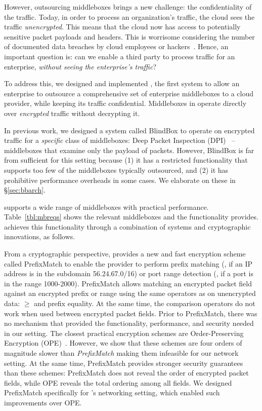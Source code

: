 However, outsourcing middleboxes brings a new challenge: the confidentiality of the traffic. 
Today, in order to process an organization's traffic, the cloud sees the traffic {\em unencrypted}.  This means that the cloud 
now has access to potentially sensitive packet payloads and headers. This is 
worrisome considering the number of documented data breaches by cloud employees or hackers~\cite{PrivacyRecords,databreach}.
Hence, an important question is: can we enable a third party to process traffic for an enterprise, {\em without seeing the enterprise's traffic}?

To address this, we designed and implemented \sys, the first system to allow an enterprise to outsource  a comprehensive set of enterprise middleboxes  to a cloud provider, while keeping its traffic confidential. 
Middleboxes in \sys operate directly over {\it encrypted} traffic without decrypting it. %


In previous work, we designed a system called BlindBox to operate on encrypted traffic for a {\em specific} class of middleboxes: Deep Packet Inspection (DPI)~\cite{blindbox} -- middleboxes that examine only the payload of packets. 
However, BlindBox is far from sufficient for this setting because
 (1) it has a restricted functionality that supports too few of the  middleboxes typically outsourced, and (2) it has prohibitive performance overheads in some cases. We elaborate on these in \S\ref{sec:bbarch}.
 


\sys supports a wide range of middleboxes with practical performance.  Table~\ref{tbl:mbreqs} shows the relevant middleboxes and the functionality \sys provides.
\sys achieves this functionality through a combination of systems and cryptographic innovations, as follows.
   
From a cryptographic perspective, \sys provides a new and fast encryption scheme called PrefixMatch  to enable the provider to perform prefix matching (\eg{}, if an IP address is in the subdomain 56.24.67.0/16) or port range detection (\eg{}, if a port is in the range 1000-2000). PrefixMatch allows matching an encrypted packet field against an encrypted prefix or range using the same operators as on unencrypted data: $\ge$ and prefix equality. At the same time, the comparison operators do not work when used between encrypted packet fields. Prior to PrefixMatch, there was no mechanism that provided the functionality, performance, and  security needed in our setting. The closest practical encryption schemes are Order-Preserving Encryption (OPE)~\cite{boldyreva:ope,popa:mope}. 
However, we show that  these schemes are four orders of magnitude slower than {\it PrefixMatch} making them infeasible for our network setting. At the same time, PrefixMatch provides stronger security guarantees than these schemes: PrefixMatch does not reveal the  order of encrypted packet fields, while OPE reveals the total ordering among all fields. We designed PrefixMatch specifically for \sys's networking setting, which enabled such improvements over OPE. 


